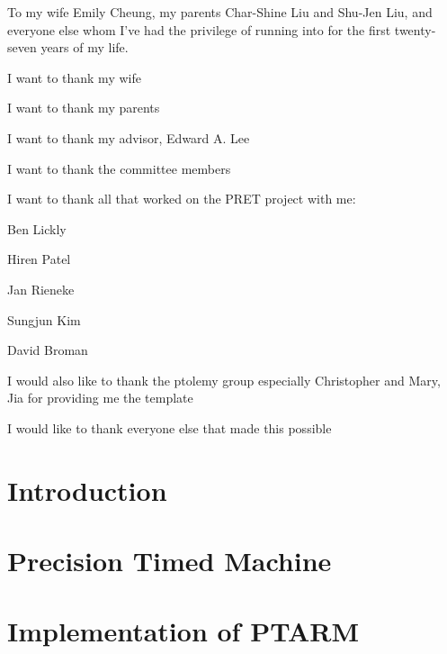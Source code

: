 \documentclass[11pt]{ucthesis}
\begin{document}
\begin{frontmatter}

\begin{dedication}
\null\vfil
{\large
\begin{center}
To my wife Emily Cheung, my parents Char-Shine Liu and Shu-Jen Liu, and everyone else whom
I've had the privilege of running into for the first twenty-seven years of my
life.
\end{center}}
\vfil\null
\end{dedication}

\tableofcontents
\listoffigures
\listoftables
\begin{acknowledgements}

I want to thank my wife

I want to thank my parents

I want to thank my advisor, Edward A. Lee

I want to thank the committee members

I want to thank all that worked on the PRET project with me: 

Ben Lickly

Hiren Patel

Jan Rieneke

Sungjun Kim

David Broman

I would also like to thank the ptolemy group especially Christopher and Mary, Jia for providing me the template

I would like to thank everyone else that made this possible

\end{acknowledgements}

\end{frontmatter}

\chapter{Introduction}
\label{chapter:intro}


\chapter{Precision Timed Machine}
\label{chapter:pret}


\chapter{Implementation of PTARM}
\label{chapter:ptarm}

\end{document}
